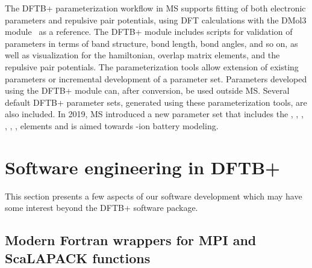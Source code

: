 \documentclass[reprint,onecolumn,superscriptaddress]{revtex4-1}
\newcommand{\dftbp}{DFTB+}
\begin{document}
The \dftbp{} parameterization workflow in MS supports fitting of both electronic
parameters and repulsive pair potentials, using DFT calculations with the DMol3
module~\cite{Delley1,Delley2} as a reference. The \dftbp{} module includes
scripts for validation of parameters in terms of band structure, bond length,
bond angles, and so on, as well as visualization for the hamiltonian, overlap
matrix elements, and the repulsive pair potentials. The parameterization tools
allow extension of existing parameters or incremental development of a parameter
set. Parameters developed using the \dftbp{} module can, after conversion, be
used outside MS. Several default \dftbp{} parameter sets, generated using these
parameterization tools, are also included. In 2019, MS introduced a new
parameter set that includes the , , , , , ,
 elements and is aimed towards -ion battery modeling.


\section{Software engineering in \dftbp{}}

This section presents a few aspects of our software development which may have
some interest beyond the \dftbp{} software package.


\subsection{Modern Fortran wrappers for MPI and ScaLAPACK functions}
\end{document}
